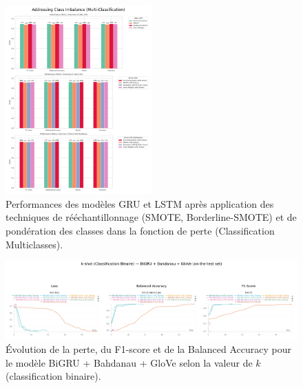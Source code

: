 \documentclass[12pt]{report}
\begin{document}
\begin{figure}[H]
\centering
\includegraphics[width=0.5\textwidth]{resampling_multi.png}
\caption{Performances des modèles GRU et LSTM après application des techniques de rééchantillonnage (SMOTE, Borderline-SMOTE) et de pondération des classes dans la fonction de perte (Classification Multiclasses).}
\label{fig:resampling_multi}
\end{figure}


\begin{figure}[H]
\centering
\includegraphics[width=1\textwidth]{kshot_binary_biGRU.png}
\caption{Évolution de la perte, du F1-score et de la Balanced Accuracy pour le modèle BiGRU + Bahdanau + GloVe selon la valeur de $k$ (classification binaire).}
\label{fig:kshot_binary_bi_Gru}
\end{figure}
\end{document}

